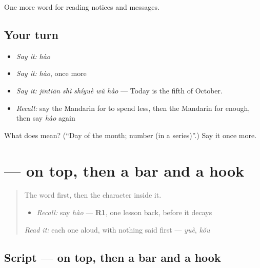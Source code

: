 \begin{grammarlens}[title={What you've built}]
One more word for reading notices and messages.
\end{grammarlens}

\subsection*{Your turn}
\begin{itemize}
\raggedright
  \item \emph{Say it:} \emph{hào}
  \item \emph{Say it:} \emph{hào}, once more
  \item \emph{Say it:} \emph{jīntiān shì shíyuè wǔ hào} — Today is the fifth of October.
  \item \emph{Recall:} say the Mandarin for to spend less, then the Mandarin for enough, then say \emph{hào} again
\end{itemize}

\begin{tcolorbox}[breakable,colback=teal!4,colframe=teal!35!black,title={Before you move on}]
What does  mean? (\textquotedblleft{}Day of the month; number (in a series)\textquotedblright{}.) Say it once more.
\end{tcolorbox}
\section[\texorpdfstring{\zh{号} (hào)}{号 (hào)}]{ —  on top, then a bar and a hook}

\label{lesson:ZH-W189-hao-number}



\begin{quote}
The word first, then the character inside it.

\begin{itemize}
\raggedright
  \item \emph{Recall:} say \emph{hào} — \textbf{R1}, one lesson back, before it decays
\end{itemize}

\begin{quote}
 
\end{quote}

\emph{Read it:} each one aloud, with nothing said first — \emph{yuè}, \emph{kǒu}
\end{quote}

\subsection*{Script —  on top, then a bar and a hook}

